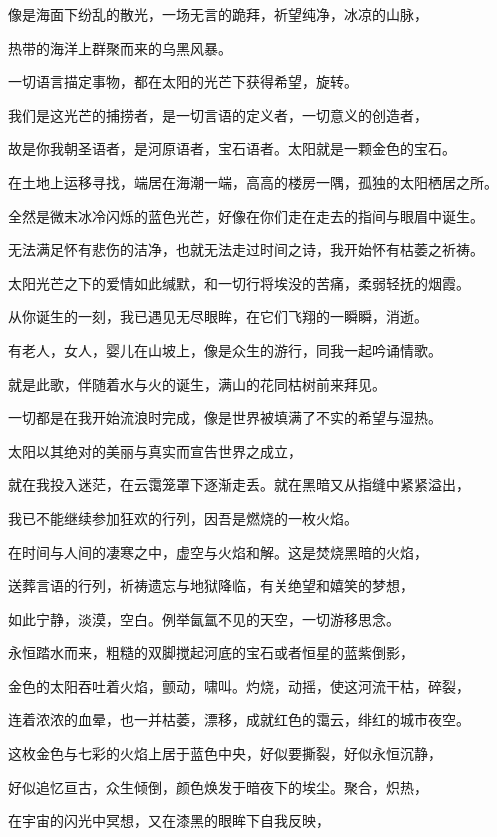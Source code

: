 \documentclass[UTF8]{article}
\begin{document}
\par 像是海面下纷乱的散光，一场无言的跪拜，祈望纯净，冰凉的山脉，
\par 热带的海洋上群聚而来的乌黑风暴。
\par 一切语言描定事物，都在太阳的光芒下获得希望，旋转。
\par 我们是这光芒的捕捞者，是一切言语的定义者，一切意义的创造者，
\par 故是你我朝圣语者，是河原语者，宝石语者。太阳就是一颗金色的宝石。
\\[0.6cm]
\par 在土地上运移寻找，端居在海潮一端，高高的楼房一隅，孤独的太阳栖居之所。
\par 全然是微末冰冷闪烁的蓝色光芒，好像在你们走在走去的指间与眼眉中诞生。
\par 无法满足怀有悲伤的洁净，也就无法走过时间之诗，我开始怀有枯萎之祈祷。
\par 太阳光芒之下的爱情如此缄默，和一切行将埃没的苦痛，柔弱轻抚的烟霞。
\par 从你诞生的一刻，我已遇见无尽眼眸，在它们飞翔的一瞬瞬，消逝。
\par 有老人，女人，婴儿在山坡上，像是众生的游行，同我一起吟诵情歌。
\par 就是此歌，伴随着水与火的诞生，满山的花同枯树前来拜见。
\par 一切都是在我开始流浪时完成，像是世界被填满了不实的希望与湿热。
\par 太阳以其绝对的美丽与真实而宣告世界之成立，
\par 就在我投入迷茫，在云霭笼罩下逐渐走丢。就在黑暗又从指缝中紧紧溢出，
\par 我已不能继续参加狂欢的行列，因吾是燃烧的一枚火焰。
\par 在时间与人间的凄寒之中，虚空与火焰和解。这是焚烧黑暗的火焰，
\par 送葬言语的行列，祈祷遗忘与地狱降临，有关绝望和嬉笑的梦想，
\par 如此宁静，淡漠，空白。例举氤氲不见的天空，一切游移思念。
\par 永恒踏水而来，粗糙的双脚搅起河底的宝石或者恒星的蓝紫倒影，
\par 金色的太阳吞吐着火焰，颤动，啸叫。灼烧，动摇，使这河流干枯，碎裂，
\par 连着浓浓的血晕，也一并枯萎，漂移，成就红色的霭云，绯红的城市夜空。
\par 这枚金色与七彩的火焰上居于蓝色中央，好似要撕裂，好似永恒沉静，
\par 好似追忆亘古，众生倾倒，颜色焕发于暗夜下的埃尘。聚合，炽热，
\par 在宇宙的闪光中冥想，又在漆黑的眼眸下自我反映，
\end{document}
